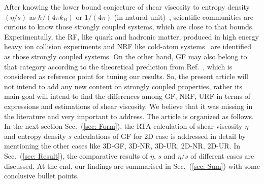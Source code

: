\documentclass[%
 reprint,
 amsmath,amssymb,
 aps,
]{revtex4-2}
\begin{document}
%
    After knowing the lower bound conjecture of shear viscosity to entropy density $(\eta/s)$ as $\hbar/(4\pi k_B)$ or $1/(4\pi)$ (in natural unit)~\cite{25Kovtun:2004de}, scientific communities are curious to know those strongly coupled systems, which are close to that bounds. Experimentally, the RF, like quark and hadronic matter, produced in high energy heavy ion collision experiments and NRF like cold-atom systems~\cite{27Sch_fer_2009} are identified as those strongly coupled systems. On the other hand, GF may also belong to that category according to the theoretical prediction from Ref.~\cite{24PhysRevLett.103.025301}, which is considered as reference point for tuning our results. So, the present article will not intend to add any new content on strongly coupled properties, rather its main goal will intend to find the differences among GF, NRF, URF in terms of expressions and estimations of shear viscosity. We believe that it was missing in the literature and very important to address.
%
    The article is organized as follows. In the next section Sec.~(\ref{sec: Form}), the RTA calculation of shear viscosity $\eta$ and entropy density $s$ calculations of GF for 2D case is addressed in detail by mentioning the other cases like 3D-GF, 3D-NR, 3D-UR, 2D-NR, 2D-UR. In Sec.~(\ref{sec: Result}), the comparative results of $\eta$, $s$ and $\eta/s$ of different cases are discussed. At the end, our findings are summarised in Sec.~(\ref{sec: Sum}) with some conclusive bullet points.
%
\end{document}
